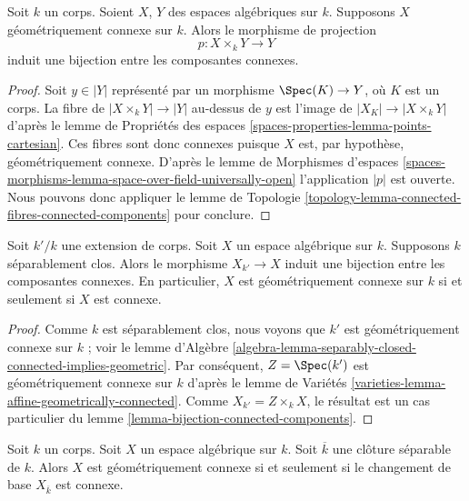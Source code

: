 \begin{lemma}
\label{lemma-bijection-connected-components}
Soit $k$ un corps. Soient $X$, $Y$ des espaces algébriques sur $k$.
Supposons $X$ géométriquement connexe sur $k$.
Alors le morphisme de projection
$$
p : X \times_k Y \longrightarrow Y
$$
induit une bijection entre les composantes connexes.
\end{lemma}

\begin{proof}
Soit $y \in |Y|$ représenté par un morphisme $\Spec(K) \to Y$,
où $K$ est un corps. La fibre de $|X \times_k Y| \to |Y|$ au-dessus de $y$
est l'image de $|X_K| \to |X \times_k Y|$ d'après le
lemme de Propriétés des espaces \ref{spaces-properties-lemma-points-cartesian}.
Ces fibres sont donc connexes puisque $X$ est, par hypothèse,
géométriquement connexe. D'après le
lemme de Morphismes d'espaces
\ref{spaces-morphisms-lemma-space-over-field-universally-open}
l'application $|p|$ est ouverte.
Nous pouvons donc appliquer le lemme de Topologie
\ref{topology-lemma-connected-fibres-connected-components}
pour conclure.
\end{proof}

\begin{lemma}
\label{lemma-separably-closed-field-connected-components}
Soit $k'/k$ une extension de corps. Soit $X$ un espace algébrique
sur $k$. Supposons $k$ séparablement clos. Alors le morphisme
$X_{k'} \to X$ induit une bijection entre les composantes connexes. En particulier,
$X$ est géométriquement connexe sur $k$ si et seulement si $X$ est connexe.
\end{lemma}

\begin{proof}
Comme $k$ est séparablement clos, nous voyons que
$k'$ est géométriquement connexe sur $k$ ; voir le
lemme d'Algèbre
\ref{algebra-lemma-separably-closed-connected-implies-geometric}.
Par conséquent, $Z = \Spec(k')$ est géométriquement connexe sur $k$ d'après le
lemme de Variétés \ref{varieties-lemma-affine-geometrically-connected}.
Comme $X_{k'} = Z \times_k X$, le résultat est un cas particulier du
lemme \ref{lemma-bijection-connected-components}.
\end{proof}

\begin{lemma}
\label{lemma-characterize-geometrically-connected}
Soit $k$ un corps. Soit $X$ un espace algébrique sur $k$.
Soit $\overline{k}$ une clôture séparable de $k$.
Alors $X$ est géométriquement connexe si et seulement si le changement de base
$X_{\overline{k}}$ est connexe.
\end{lemma}

